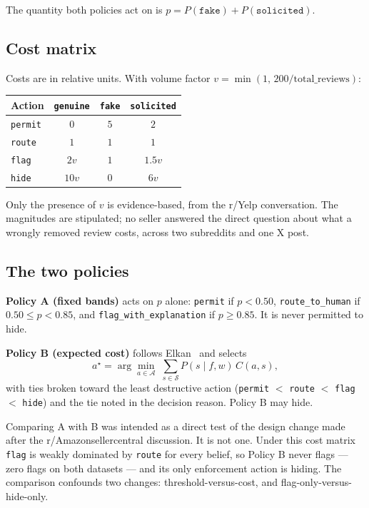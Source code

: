 \documentclass{article}
\begin{document}
The quantity both policies act on is
$p = P(\texttt{fake}) + P(\texttt{solicited})$.

\subsection{Cost matrix}

Costs are in relative units. With volume factor
$v=\min(1,\,200/\text{total\_reviews})$:

\begin{center}
\small
\begin{tabular}{lccc}
\toprule
Action & \texttt{genuine} & \texttt{fake} & \texttt{solicited} \\
\midrule
\texttt{permit} & $0$    & $5$ & $2$ \\
\texttt{route}  & $1$    & $1$ & $1$ \\
\texttt{flag}   & $2v$   & $1$ & $1.5v$ \\
\texttt{hide}   & $10v$  & $0$ & $6v$ \\
\bottomrule
\end{tabular}
\end{center}

Only the presence of $v$ is evidence-based, from the r/Yelp conversation. The
magnitudes are stipulated; no seller answered the direct question about what a
wrongly removed review costs, across two subreddits and one X post.

\subsection{The two policies}

\textbf{Policy A (fixed bands)} acts on $p$ alone: \texttt{permit} if
$p<0.50$, \texttt{route\_to\_human} if $0.50\le p<0.85$, and
\texttt{flag\_with\_explanation} if $p\ge0.85$. It is never permitted to hide.

\textbf{Policy B (expected cost)} follows Elkan~
and selects
\begin{equation}
    a^\star = \arg\min_{a\in\mathcal{A}}\;
    \sum_{s\in\mathcal{S}} P(s \mid f, w)\, C(a, s),
    \label{eq:argmin}
\end{equation}
with ties broken toward the least destructive action
(\texttt{permit} $<$ \texttt{route} $<$ \texttt{flag} $<$ \texttt{hide}) and the
tie noted in the decision reason. Policy B may hide.

Comparing A with B was intended as a direct test of the design change made
after the r/Amazonsellercentral discussion. It is not one. Under this cost
matrix \texttt{flag} is weakly dominated by \texttt{route} for every belief, so
Policy B never flags --- zero flags on both datasets --- and its only
enforcement action is hiding. The comparison confounds two changes:
threshold-versus-cost, and flag-only-versus-hide-only.
\end{document}
